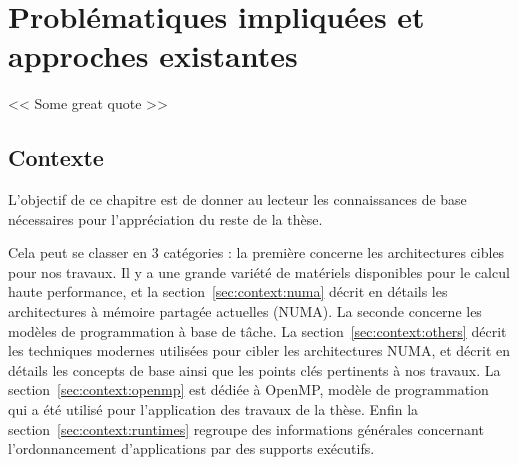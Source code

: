 \part{Problématiques impliquées et approches existantes}

\begin{savequote}[6cm]
<< Some great quote  >>
\end{savequote}
\chapter{Contexte}\label{chap:contexte}
\chaptertoc

L'objectif de ce chapitre est de donner au lecteur les connaissances de base nécessaires pour l'appréciation du reste de la thèse.

Cela peut se classer en 3 catégories : la première concerne les architectures cibles pour nos travaux. Il y a une grande variété de matériels disponibles pour le calcul haute performance, et la section~\ref{sec:context:numa} décrit en détails les architectures à mémoire partagée actuelles (NUMA).
La seconde concerne les modèles de programmation à base de tâche. La section~\ref{sec:context:others} décrit les techniques modernes utilisées pour cibler les architectures NUMA, et décrit en détails les concepts de base ainsi que les points clés pertinents à nos travaux. La section~\ref{sec:context:openmp} est dédiée à OpenMP, modèle de programmation qui a été utilisé pour l'application des travaux de la thèse.
Enfin la section~\ref{sec:context:runtimes} regroupe des informations générales concernant l'ordonnancement d'applications par des supports exécutifs.







